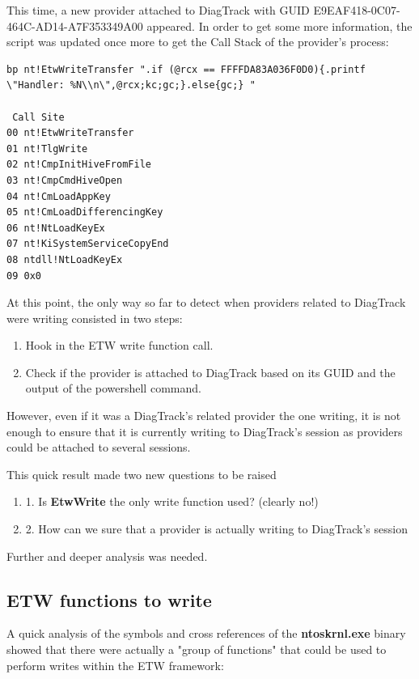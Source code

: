 This time, a new provider attached to DiagTrack with GUID E9EAF418-0C07-464C-AD14-A7F353349A00 appeared. In order to get some more information, the script was updated once more to get the Call Stack of the provider's process:
\begin{lstlisting}
bp nt!EtwWriteTransfer ".if (@rcx == FFFFDA83A036F0D0){.printf \"Handler: %N\\n\",@rcx;kc;gc;}.else{gc;} "
 
 Call Site
00 nt!EtwWriteTransfer
01 nt!TlgWrite
02 nt!CmpInitHiveFromFile
03 nt!CmpCmdHiveOpen
04 nt!CmLoadAppKey
05 nt!CmLoadDifferencingKey
06 nt!NtLoadKeyEx
07 nt!KiSystemServiceCopyEnd
08 ntdll!NtLoadKeyEx
09 0x0
\end{lstlisting}

At this point, the only way so far to detect when providers related to DiagTrack were writing consisted in two steps: 
\begin{enumerate}
\setlength\itemsep{0.05em}
\item Hook in the ETW write function call.
\item Check if the provider is attached to DiagTrack based on its GUID and the output of the powershell command.
\end{enumerate}

However, even if it was a DiagTrack's related provider the one writing, it is not enough to ensure that it is currently writing to DiagTrack's session as providers could be attached to several sessions.

This quick result made two new questions to be raised
\begin{enumerate}
\setlength\itemsep{0.05em}
  \item 1. Is {\bfseries EtwWrite} the only write function used? (clearly no!)
  \item 2. How can we sure that a provider is actually writing to DiagTrack's session
\end{enumerate}

Further and deeper analysis was needed.

\subsection{\bfseries{ETW functions to write}}

A quick analysis of the symbols and cross references of the {\bfseries ntoskrnl.exe} binary showed that there were actually a "group of functions" that could be used to perform writes within the ETW framework:

